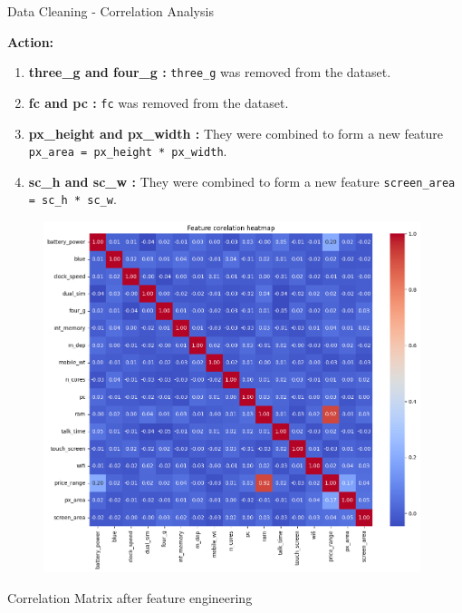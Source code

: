 \documentclass[14pt, aspectratio=169]{beamer}
\begin{document}
\begin{frame}{Data Cleaning - Correlation Analysis}
  \begin{block}{}
    \textbf{Action:} \small
    \begin{enumerate}
      \setlength\itemsep{.05em}
      \item{\textbf{three\_g and four\_g :}} \texttt{three\_g} was removed from the dataset.
      \item{\textbf{fc and pc :}} \texttt{fc} was removed from the dataset.
      \item{\textbf{px\_height and px\_width :}} They were combined to form a new feature \texttt{px\_area = px\_height * px\_width}.
      \item{\textbf{sc\_h and sc\_w :}} They were combined to form a new feature \texttt{screen\_area = sc\_h * sc\_w}.
    \end{enumerate}
  \end{block}

  \begin{minipage}{0.6\textwidth}
    \begin{figure}[H]
      \centering
      \includegraphics[width=0.98\textwidth]{../report/corr_viz_after_fe.png}
    \end{figure}
  \end{minipage}
  \hfill
  \begin{minipage}{0.3\textwidth} \small
    Correlation Matrix after feature engineering
    \normalsize
  \end{minipage}
\end{frame}
\end{document}
